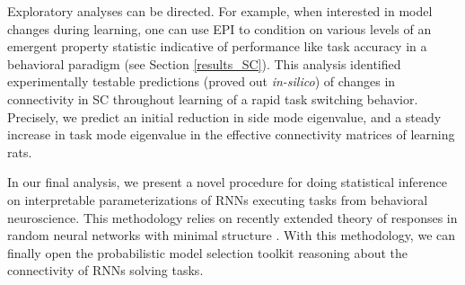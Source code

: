 \documentclass[11pt]{article}
\begin{document}
Exploratory analyses can be directed.  For example,  when interested in model changes during learning, one can use EPI to condition on various levels of an emergent property statistic indicative of performance like task accuracy in a behavioral paradigm (see Section \ref{results_SC}).
This analysis identified experimentally testable predictions (proved out \textit{in-silico}) of changes in connectivity in SC throughout learning of a rapid task switching behavior.
Precisely, we predict an initial reduction in side mode eigenvalue, and a steady increase in task mode eigenvalue in the effective connectivity matrices of learning rats.

In our final analysis, we present a novel procedure for doing statistical inference on interpretable parameterizations of RNNs executing tasks from behavioral neuroscience.  This methodology relies on recently extended theory of responses in random neural networks with minimal structure \cite{mastrogiuseppe2018linking}. With this methodology, we can finally open the probabilistic model selection toolkit reasoning about the connectivity of RNNs solving tasks.

\end{document}
